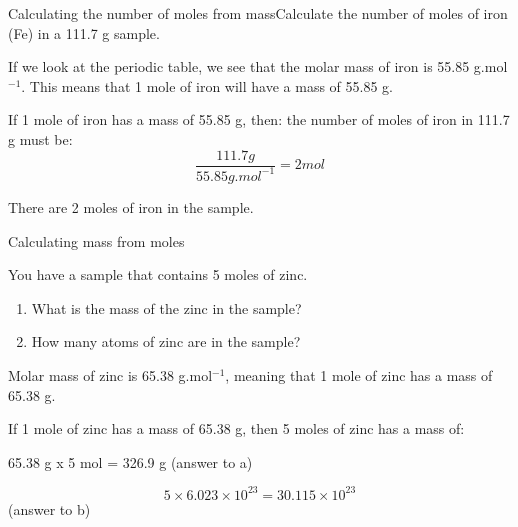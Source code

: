 \begin{wex}{Calculating the number of moles from mass}{Calculate the number of moles of iron (Fe) in a 111.7 g sample.\\}

{
If we look at the periodic table, we see that the molar mass of iron is 55.85 g.mol$^{-1}$. This means that 1 mole of iron will have a mass of 55.85 g.\\
}

{
If 1 mole of iron has a mass of 55.85 g, then: the number of moles of iron in 111.7 g must be:
\begin{equation*}
\frac{111.7 g}{55.85 g.mol^{-1}} = 2 mol
\end{equation*}

There are 2 moles of iron in the sample.
}
\end{wex}

\begin{wex}{Calculating mass from moles}{You have a sample that contains 5 moles of zinc.

\begin{enumerate}
\item{What is the mass of the zinc in the sample?}
\item{How many atoms of zinc are in the sample?}
\end{enumerate}
}

{
Molar mass of zinc is 65.38 g.mol$^{-1}$, meaning that 1 mole of zinc has a mass of 65.38 g.
}\\

{
If 1 mole of zinc has a mass of 65.38 g, then 5 moles of zinc has a mass of:
\begin{center}
65.38 g x 5 mol = 326.9 g (answer to a)
\end{center}
}
{
\begin{equation*}
5 \times 6.023 \times 10^{23} = 30.115 \times 10^{23} 
\end{equation*}
(answer to b) } 
\end{wex}

